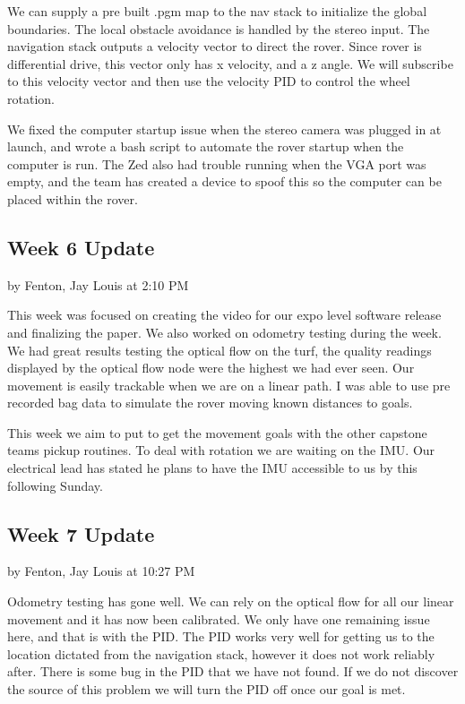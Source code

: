 \documentclass[10pt, oneside,onecolumn]{IEEEtran}
\begin{document}
\begin{titlepage}
We can supply a pre built .pgm map to the nav stack to initialize the global boundaries. The local obstacle avoidance is handled by the stereo input. The navigation stack outputs a velocity vector to direct the rover. Since rover is differential drive, this vector only has x velocity, and a z angle. We will subscribe to this velocity vector and then use the velocity PID to control the wheel rotation. 

We fixed the computer startup issue when the stereo camera was plugged in at launch, and wrote a bash script to automate the rover startup when the computer is run. The Zed also had trouble running when the VGA port was empty, and the team has created a device to spoof this so the computer can be placed within the rover. 

\subsection{Week 6 Update}
by Fenton, Jay Louis at 2:10 PM

This week was focused on creating the video for our expo level software release and finalizing the paper. We also worked on odometry testing during the week. We had great results testing the optical flow on the turf, the quality readings displayed by the optical flow node were the highest we had ever seen. Our movement is easily trackable when we are on a linear path. I was able to use pre recorded bag data to simulate the rover moving known distances to goals.

This week we aim to put to get the movement goals with the other capstone teams pickup routines. To deal with rotation we are waiting on the IMU. Our electrical lead has stated he plans to have the IMU accessible to us by this following Sunday. 

\subsection{Week 7 Update}
by Fenton, Jay Louis at 10:27 PM

Odometry testing has gone well. We can rely on the optical flow for all our linear movement and it has now been calibrated. We only have one remaining issue here, and that is with the PID. The PID works very well for getting us to the location dictated from the navigation stack, however it does not work reliably after. There is some bug in the PID that we have not found. If we do not discover the source of this problem we will turn the PID off once our goal is met. 


\end{titlepage}
\end{document}
